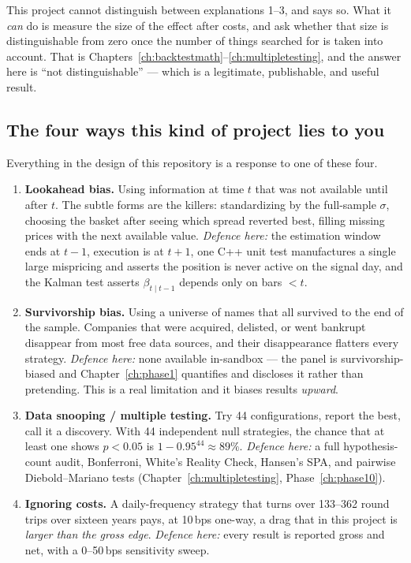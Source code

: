 This project cannot distinguish between explanations 1--3, and says so. What it
\emph{can} do is measure the size of the effect after costs, and ask whether that size
is distinguishable from zero once the number of things searched for is taken into
account. That is Chapters~\ref{ch:backtestmath}--\ref{ch:multipletesting}, and the
answer here is ``not distinguishable'' --- which is a legitimate, publishable, and
useful result.

\subsection{The four ways this kind of project lies to you}
\label{sec:saa:lies}

Everything in the design of this repository is a response to one of these four.

\begin{enumerate}[label=\textbf{Lie \arabic*.}]
  \item \textbf{Lookahead bias.} Using information at time $t$ that was not available
    until after $t$. The subtle forms are the killers: standardizing by the
    full-sample $\sigma$, choosing the basket after seeing which spread reverted best,
    filling missing prices with the next available value. \emph{Defence here:} the
    estimation window ends at $t-1$, execution is at $t+1$, one C++ unit test
    manufactures a single large mispricing and asserts the position is never active on
    the signal day, and the Kalman test asserts $\beta_{t\mid t-1}$ depends only on bars
    $<t$.
  \item \textbf{Survivorship bias.} Using a universe of names that all survived to the
    end of the sample. Companies that were acquired, delisted, or went bankrupt
    disappear from most free data sources, and their disappearance flatters every
    strategy. \emph{Defence here:} none available in-sandbox --- the panel is
    survivorship-biased and Chapter~\ref{ch:phase1} quantifies and discloses it rather
    than pretending. This is a real limitation and it biases results \emph{upward}.
  \item \textbf{Data snooping / multiple testing.} Try 44 configurations, report the
    best, call it a discovery. With 44 independent null strategies, the chance that at
    least one shows $p<0.05$ is $1-0.95^{44}\approx 89\%$. \emph{Defence here:} a full
    hypothesis-count audit, Bonferroni, White's Reality Check, Hansen's SPA, and
    pairwise Diebold--Mariano tests (Chapter~\ref{ch:multipletesting},
    Phase~\ref{ch:phase10}).
  \item \textbf{Ignoring costs.} A daily-frequency strategy that turns over 133--362
    round trips over sixteen years pays, at 10\,bps one-way, a drag that in this
    project is \emph{larger than the gross edge}. \emph{Defence here:} every result is
    reported gross and net, with a 0--50\,bps sensitivity sweep.
\end{enumerate}

